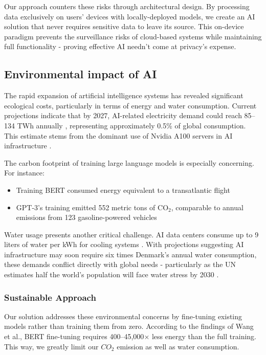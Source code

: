 \documentclass[licencjacka,en]{pracamgr}
\begin{document}
Our approach counters these risks through architectural design. By processing data exclusively on users' devices with locally-deployed models, we create an AI solution that never requires sensitive data to leave its source. This on-device paradigm prevents the surveillance risks of cloud-based systems while maintaining full functionality - proving effective AI needn't come at privacy's expense.

\subsection{Environmental impact of AI}
The rapid expansion of artificial intelligence systems has revealed significant ecological costs, particularly in terms of energy and water consumption. Current projections indicate that by 2027, AI-related electricity demand could reach 85--134 TWh annually \cite{this_study}, representing approximately 0.5\% of global consumption. This estimate stems from the dominant use of Nvidia A100 servers in AI infrastructure \cite{nyt_el}.

The carbon footprint of training large language models is especially concerning. For instance:
\begin{itemize}
    \item Training BERT consumed energy equivalent to a transatlantic flight
    \item GPT-3's training emitted 552 metric tons of CO$_2$, comparable to annual emissions from 123 gasoline-powered vehicles \cite{sci_am_co2}
\end{itemize}

Water usage presents another critical challenge. AI data centers consume up to 9 liters of water per kWh for cooling systems \cite{first}. With projections suggesting AI infrastructure may soon require six times Denmark's annual water consumption, these demands conflict directly with global needs - particularly as the UN estimates half the world's population will face water stress by 2030 \cite{water_scarcity}.

\subsubsection{Sustainable Approach}
Our solution addresses these environmental concerns by fine-tuning existing models rather than training them from zero. According to the findings of Wang et al., BERT fine-tuning requires 400--45,000$\times$ less energy than the full training. This way, we greatly limit our $CO_2$ emission as well as water consumption.
\end{document}
